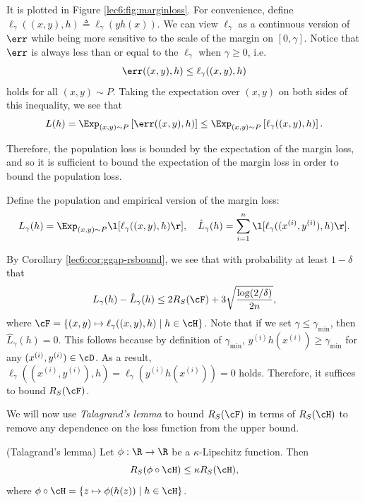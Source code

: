 It is plotted in Figure \ref{lec6:fig:marginloss}. For convenience, define $\ell_\gamma((x,y), h) \triangleq \ell_\gamma(yh(x))$. We can view $\ell_\gamma$ as a continuous version of $\err$ while being more sensitive to the scale of the margin on $[0,\gamma]$. Notice that $\err$ is always less than or equal to the $\ell_\gamma$ when $\gamma\geq 0$, i.e.
\begin{equation}
    \err((x,y), h)\leq \ell_\gamma ((x,y), h)
\end{equation}
holds for all $(x,y)\sim P$. Taking the expectation over $(x,y)$ on both sides of this inequality, we see that
\begin{equation}
    L(h) = \Exp_{(x,y)\sim P} \left[ \err((x,y), h) \right] \leq \Exp_{(x,y)\sim P} \left[ \ell_\gamma ((x,y), h) \right].
\end{equation}

Therefore, the population loss is bounded by the expectation of the margin loss, and so it is sufficient to bound the expectation of the margin loss in order to bound the population loss.

Define the population and empirical version of the margin loss:
\begin{equation}
L_\gamma(h) = \Exp_{(x,y)\sim P}\l[ \ell_\gamma((x,y), h)\r], \quad \hat{L}_\gamma(h) = \sum_{i=1}^n\l [\ell_\gamma((x^{(i)},y^{(i)}), h)\r].
\end{equation}

By Corollary \ref{lec6:cor:ggap-rsbound}, we see that with probability at least $1-\delta$ that
\begin{equation}
L_\gamma(h) - \hat{L}_\gamma(h)\leq 2R_S(\cF) + 3\sqrt{\frac{\log (2/\delta)}{2n}},
\end{equation}
where $\cF = \{(x,y)\mapsto \ell_\gamma((x,y), h)\mid h\in\cH\}$. Note that if we set $\gamma\leq \gamma_{\min}$, then $\hat{L}_{\gamma}(h) = 0$. This follows because by definition of $\gamma_{\min}$, $y^{(i)}h(x^{(i)})\geq \gamma_{\min}$ for any $(x^{(i)}, y^{(i)})\in \cD$. As a result, $\ell_\gamma((x^{(i)}, y^{(i)}), h) = \ell_\gamma(y^{(i)}h(x^{(i)})) = 0$ holds. Therefore, it suffices to bound $R_S(\cF)$.

We will now use \textit{Talagrand's lemma} to bound $R_S(\cF)$ in terms of $R_S(\cH)$ to remove any dependence on the loss function from the upper bound. 
 
\begin{lemma}{(Talagrand's lemma)}
Let $\phi:\R\to\R$ be a $\kappa$-Lipschitz function. Then \begin{equation}
    R_S(\phi\circ \cH)\leq \kappa R_S(\cH),
\end{equation} 
where $\phi\circ\cH = \{z\mapsto \phi(h(z))\mid h\in\cH\}$.
\end{lemma}

